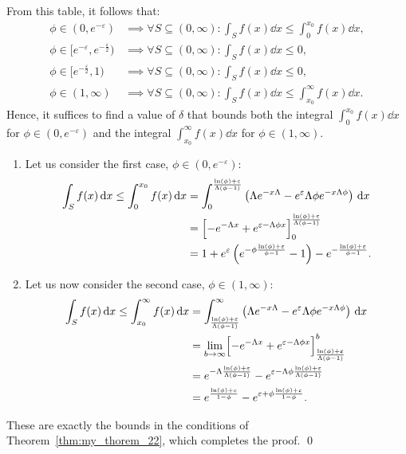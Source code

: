 From this table, it follows that:
\begin{align*}
\phi \in (0, e^{-\varepsilon}) &\implies \forall S \subseteq (0, \infty) : \int_{S} f(x) \dd x \leq \int_{0}^{x_0} f(x) \dd x, \\
\phi \in \bigl[e^{-\varepsilon}, e^{-\frac{\varepsilon}{2}}\bigr) &\implies \forall S \subseteq (0, \infty) : \int_{S} f(x) \dd x \leq 0, \\
\phi \in \bigl[e^{-\frac{\varepsilon}{2}}, 1\bigr) &\implies \forall S \subseteq (0, \infty) : \int_{S} f(x) \dd x \leq 0, \\
\phi \in (1, \infty) &\implies \forall S \subseteq (0, \infty) : \int_{S} f(x) \dd x \leq \int_{x_0}^{\infty} f(x) \dd x.
\end{align*}
Hence, it suffices to find a value of $\delta$ that bounds both the integral $\int_{0}^{x_0} f(x) \dd x$ for $\phi \in (0, e^{-\varepsilon})$ and the integral $\int_{x_0}^{\infty} f(x) \dd x$ for $\phi \in (1, \infty)$.
\begin{enumerate}[label=\arabic*.]
\item Let us consider the first case, $\phi \in (0, e^{-\varepsilon})$:
\begin{align*}
\int_{S} f(x) \,\mathrm{d} x \leq \int_{0}^{x_0} f(x) \,\mathrm{d} x
  &= \int_{0}^{\frac{\ln(\phi) + \varepsilon}{\Lambda(\phi -1)}} \left( \Lambda e^{-x\Lambda} - e^{\varepsilon}\Lambda\phi e^{-x\Lambda\phi} \right) \,\mathrm{d} x \\
  &= \Bigl[-e^{-\Lambda x} + e^{\varepsilon -\Lambda \phi x}\Bigr]_{0}^{\frac{\ln(\phi)+\varepsilon}{\Lambda(\phi -1)}} \\
  &= 1 + e^{\varepsilon}\left(e^{-\phi\frac{\ln(\phi) + \varepsilon}{\phi - 1}} - 1\right) - e^{-\frac{\ln(\phi) + \varepsilon}{\phi - 1}}.
\end{align*}

\item Let us now consider the second case, $\phi \in (1, \infty)$:
\begin{align*}
\int_{S} f(x) \,\mathrm{d} x \leq \int_{x_0}^{\infty} f(x) \,\mathrm{d} x
  &= \int_{\frac{\ln(\phi) + \varepsilon}{\Lambda(\phi-1)}}^{\infty} \left( \Lambda e^{-x\Lambda} - e^{\varepsilon}\Lambda\phi e^{-x\Lambda\phi} \right) \,\mathrm{d} x \\
  &= \lim_{b \to \infty} \Bigl[-e^{-\Lambda x} + e^{\varepsilon -\Lambda \phi x}\Bigr]_{\frac{\ln(\phi) + \varepsilon}{\Lambda(\phi-1)}}^{b} \\
  &= e^{-\Lambda \frac{\ln(\phi) + \varepsilon}{\Lambda(\phi-1)}} - e^{\varepsilon -\Lambda \phi \frac{\ln(\phi) + \varepsilon}{\Lambda(\phi-1)}} \\
  &= e^{\frac{\ln(\phi) + \varepsilon}{1-\phi}} - e^{\varepsilon + \phi \frac{\ln(\phi) + \varepsilon}{1-\phi}}.
\end{align*}
\end{enumerate}
These are exactly the bounds in the conditions of Theorem~\ref{thm:my_thorem_22}, which completes the proof. \qed


